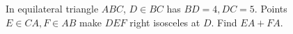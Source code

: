In equilateral triangle $ABC$, $D\in BC$ has $BD=4,DC=5$. Points $E\in CA,F\in AB$ make $DEF$ right isosceles at $D$. Find $EA+FA$.
